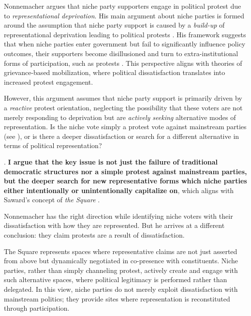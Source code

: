Nonnemacher \parencite*{nonnemacher2023} argues that niche party supporters engage in political protest due to \textit{representational deprivation}. His main argument about niche parties is formed around the assumption that niche party support is caused by a \textit{build-up} of representational deprivation leading to political protests \parencite[see 30]{nonnemacher2023}. His framework suggests that when niche parties enter government but fail to significantly influence policy outcomes, their supporters become disillusioned and turn to extra-institutional forms of participation, such as protests \parencite{nonnemacher2023}. This perspective aligns with theories of grievance-based mobilization, where political dissatisfaction translates into increased protest engagement.

However, this argument assumes that niche party support is primarily driven by a \textit{reactive} protest orientation, neglecting the possibility that these voters are not merely responding to deprivation but are \textit{actively seeking} alternative modes of representation. Is the niche vote simply a protest vote against mainstream parties (see \cite{hong2015, nonnemacher2023, stiers2024}), or is there a deeper dissatisfaction or search for a different alternative in terms of political representation?

.
\textbf{I argue that the key issue is not just the failure of traditional democratic structures nor a simple protest against mainstream parties, but the deeper search for new representative forms which niche parties either intentionally or unintentionally capitalize on}, which aligns with Saward’s concept of \textit{the Square} \parencite{saward2024}.

Nonnemacher has the right direction while identifying niche voters with their dissatisfaction with how they are represented. But he arrives at a different conclusion: they claim protests are a result of dissatisfaction.

The Square represents spaces where representative claims are not just asserted from above but dynamically negotiated in co-presence with constituents. Niche parties, rather than simply channeling protest, actively create and engage with such alternative spaces, where political legitimacy is performed rather than delegated. In this view, niche parties do not merely exploit dissatisfaction with mainstream politics; they provide sites where representation is reconstituted through participation.

